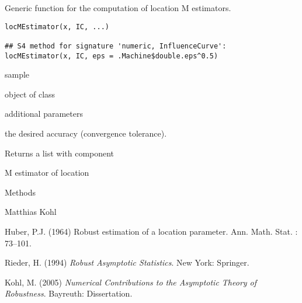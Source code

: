 \begin{Description}\relax
Generic function for the computation of location M estimators.
\end{Description}
\begin{Usage}
\begin{verbatim}
locMEstimator(x, IC, ...)

## S4 method for signature 'numeric, InfluenceCurve':
locMEstimator(x, IC, eps = .Machine$double.eps^0.5)
\end{verbatim}
\end{Usage}
\begin{Arguments}
\begin{ldescription}
\item[\code{x}] sample 
\item[\code{IC}] object of class  
\item[\code{...}] additional parameters 
\item[\code{eps}] the desired accuracy (convergence tolerance). 
\end{ldescription}
\end{Arguments}
\begin{Value}
Returns a list with component
\begin{ldescription}
\item[\code{loc}] M estimator of location 
\end{ldescription}
\end{Value}
\begin{Section}{Methods}
\end{Section}
\begin{Author}\relax
Matthias Kohl 
\end{Author}
\begin{References}\relax
Huber, P.J. (1964) Robust estimation of a location parameter. 
Ann. Math. Stat. : 73--101.

Rieder, H. (1994) \emph{Robust Asymptotic Statistics}. New York: Springer.

Kohl, M. (2005) \emph{Numerical Contributions to the Asymptotic Theory of Robustness}. 
Bayreuth: Dissertation.
\end{References}
\begin{SeeAlso}\relax
{}
\end{SeeAlso}

